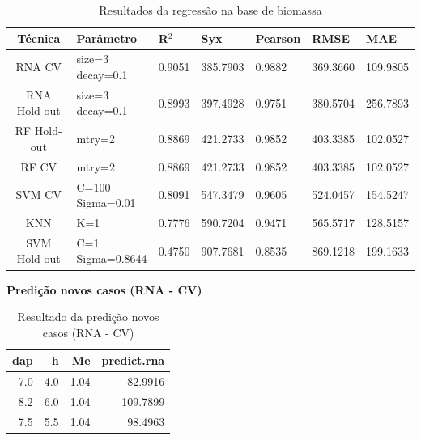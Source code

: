 \begin{table}[H]
\caption{Resultados da regressão na base de biomassa}
\hspace*{-1.5cm} 
\begin{minipage}{\textwidth}
\centering
{\renewcommand{\arraystretch}{1.7} %

\begin{tabular}{|c|p{3cm}|p{2cm}|p{2cm}|p{2cm}|p{2cm}|p{2cm}|}
\hline
\textbf{Técnica} & \textbf{Parâmetro} & \textbf{R$^2$} & \textbf{Syx} & \textbf{Pearson} & \textbf{RMSE} & \textbf{MAE} \\
\hline
\colorbox[HTML]{CAF2C2}{RNA CV} & \makecell[l]{size=3\\decay=0.1} & \colorbox[HTML]{CAF2C2}{0.9051} & \colorbox[HTML]{CAF2C2}{385.7903} & \colorbox[HTML]{CAF2C2}{0.9882} & \colorbox[HTML]{CAF2C2}{369.3660} & 109.9805 \\
\hline
RNA Hold-out & \makecell[l]{size=3\\decay=0.1} & 0.8993 & 397.4928 & 0.9751 & 380.5704 & 256.7893 \\
\hline
RF Hold-out & mtry=2 & 0.8869 & 421.2733 & 0.9852 & 403.3385 & \colorbox[HTML]{CAF2C2}{102.0527} \\
\hline
RF CV & mtry=2 & 0.8869 & 421.2733 & 0.9852 & 403.3385 & \colorbox[HTML]{CAF2C2}{102.0527} \\
\hline
SVM CV & \makecell[l]{C=100\\Sigma=0.01} & 0.8091 & 547.3479 & 0.9605 & 524.0457 & 154.5247 \\
\hline
KNN & K=1 & 0.7776 & 590.7204 & 0.9471 & 565.5717 & 128.5157 \\
\hline
SVM Hold-out & \makecell[l]{C=1\\Sigma=0.8644} & 0.4750 & 907.7681 & 0.8535 & 869.1218 & 199.1633 \\
\hline
\end{tabular}
}
\end{minipage}
\end{table}



\begin{center}
    \textbf{Predição novos casos (RNA - CV)}
\end{center}

\begin{table}[H]
\centering
\caption{Resultado da predição novos casos (RNA - CV)}
\begin{tabular}{|r|r|r|r|}
\hline
dap & h & Me & predict.rna \\
\hline
7.0 & 4.0 & 1.04 & 82.9916 \\
\hline
8.2 & 6.0 & 1.04 & 109.7899 \\
\hline
7.5 & 5.5 & 1.04 & 98.4963 \\
\hline
\end{tabular}
\end{table}


